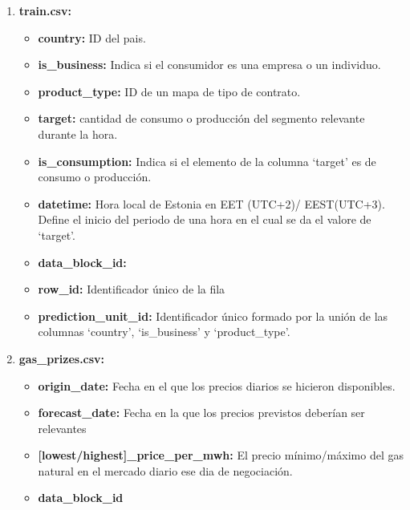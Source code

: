 \documentclass[a4paper,12pt]{article}
\begin{document}
\begin{enumerate}
    \item \textbf{train.csv:}
    \begin{itemize}
        \item \textbf{country:} 
        ID del pais.
        \item \textbf{is\_business:}
        Indica si el consumidor es una empresa o
        un individuo.
        \item \textbf{product\_type:}
        ID de un mapa de tipo de contrato.
        \item \textbf{target:} 
        cantidad de consumo o producción del 
        segmento relevante durante la hora. 
        \item \textbf{is\_consumption:}
        Indica si el elemento de la columna 
        `target' es de consumo o producción.
        \item \textbf{datetime:}
        Hora local de Estonia en EET (UTC+2)/
        EEST(UTC+3). Define el inicio del periodo
        de una hora en el cual se da el valore de 
        `target'.
        \item \textbf{data\_block\_id:}
        
        \item \textbf{row\_id:}
        Identificador único de la fila
        \item \textbf{prediction\_unit\_id:}
        Identificador único formado por la unión de
        las columnas `country', `is\_business' y 
        `product\_type'.
    \end{itemize}
    
    \item \textbf{gas\_prizes.csv:}
    \begin{itemize}
        \item \textbf{origin\_date:}
        Fecha en el que los precios diarios
        se hicieron disponibles.
        \item \textbf{forecast\_date:}
        Fecha en la que los precios previstos
        deberían ser relevantes
        \item \textbf{[lowest/highest]\_price\_per\_mwh:}
        El precio mínimo/máximo del gas natural en el 
        mercado diario ese dia de negociación.
        \item \textbf{data\_block\_id}
    \end{itemize}


\end{enumerate}
\end{document}
